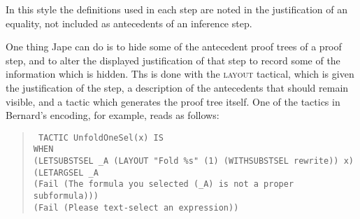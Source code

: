 In this style the definitions used in each step are noted in the justification of an equality, not included as antecedents of an inference step. 

One thing Jape can do is to hide some of the antecedent proof trees of a proof step, and to alter the displayed justification of that step to record some of the information which is hidden. Ths is done with the \textsc{layout} tactical, which is given the justification of the step, a description of the antecedents that should remain visible, and a tactic which generates the proof tree itself. One of the tactics in Bernard's encoding, for example, reads as follows:
\begin{quote}\tt\small
TACTIC UnfoldOneSel(x) IS \\
\tab WHEN    \\
\tab \tab (LETSUBSTSEL \_A (LAYOUT "Fold \%s" (1) (WITHSUBSTSEL rewrite)) x) \\
\tab \tab (LETARGSEL \_A \\
\tab \tab \tab (Fail (The formula you selected (\_A) is not a proper subformula))) \\
\tab \tab (Fail (Please text-select an expression))
\end{quote}
